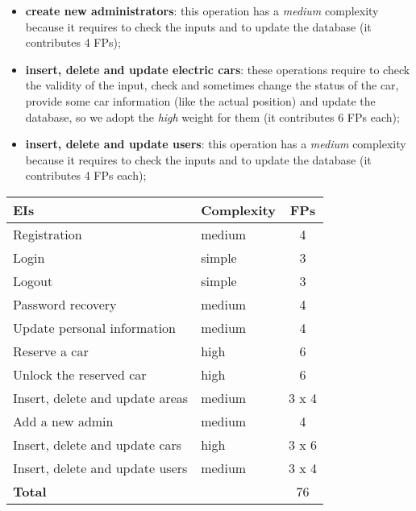 \begin{itemize}
\begin{itemize}
			\item \textbf{create new administrators}: this operation has a \textit{medium} complexity because it requires to check the inputs and to update the database (it contributes 4 FPs);
			\item \textbf{insert, delete and update electric cars}: these operations require to check the validity of the input, check and sometimes change the status of the car, provide some car information (like the actual position) and update the database, so we adopt the \textit{high} weight for them (it contributes 6 FPs each);
			\item \textbf{insert, delete and update users}: this operation has a \textit{medium} complexity because it requires to check the inputs and to update the database (it contributes 4 FPs each);
		\end{itemize}
\end{itemize}

\begin{center}
	\begin{tabular}{|l|l|c|}
		\hline
		\textbf{EIs} 	& \textbf{Complexity} 	& \textbf{FPs} \\
		\hline
		Registration 	& medium 	& 4 \\
		Login 	& simple 	& 3 \\
		Logout 	& simple 	& 3 \\
		Password recovery 	& medium 	& 4 \\
		Update personal information 	& medium 	& 4 \\
		Reserve a car 	& high 	& 6 \\
		Unlock the reserved car 	& high 	& 6 \\
		Insert, delete and update areas 	& medium 	& 3 x 4 \\
		Add a new admin 	& medium 	& 4 \\
		Insert, delete and update cars 	& high 	& 3 x 6 \\
		Insert, delete and update users 	& medium 	& 3 x 4 \\		
		\hline \hline
		\textbf{Total} 	& 	& 76 \\
		\hline
	\end{tabular}
\end{center}

